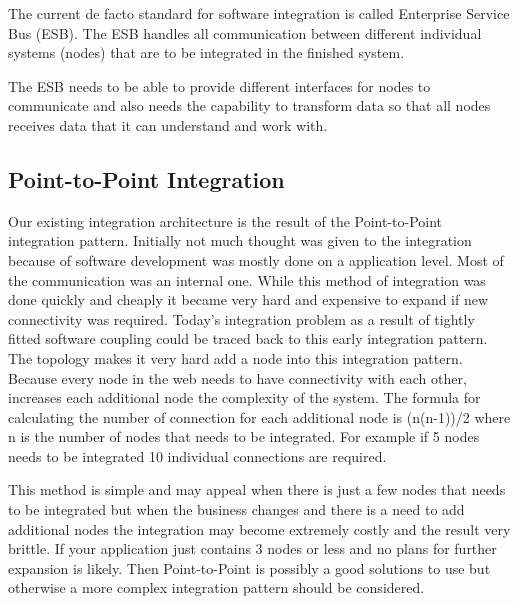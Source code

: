 \documentclass{llncs}
\begin{document}
The current de facto standard for software integration is called Enterprise Service Bus (ESB). The ESB handles all communication between different individual systems (nodes) that are to be integrated in the finished system.

The ESB needs to be able to provide different interfaces for nodes to communicate and also needs the capability to transform data so that all nodes receives data that it can understand and work with.

\label{sec:background}

\subsection{Point-to-Point Integration}
Our existing integration architecture is the result of the Point-to-Point integration pattern. Initially not much thought was given to the integration because of software development was mostly done on a application level. Most of the communication was an internal one. While this method of integration was done quickly and cheaply it became very hard and expensive to expand if new connectivity was required. Today's integration problem as a result of tightly fitted software coupling could be traced back to this early integration pattern. The topology makes it very hard add a node into this integration pattern. Because every node in the web needs to have connectivity with each other, increases each additional node the complexity of the system. The  formula for calculating the number of connection for each additional node is (n(n-1))/2 where n is the number of nodes that needs to be integrated. For example if 5 nodes needs to be integrated 10 individual connections are required.

This method is simple and may appeal when there is just a few nodes that needs to be integrated but when the business changes and there is a need to add additional nodes the integration may become extremely costly and the result very brittle. If your application just contains 3 nodes or less and no plans for further expansion is likely. Then Point-to-Point is possibly a good solutions to use but otherwise a more complex integration pattern should be considered.
\end{document}
